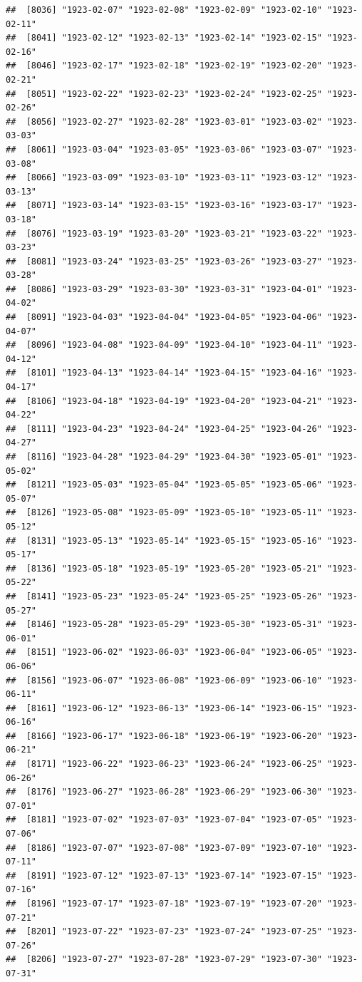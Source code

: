\documentclass{article}\usepackage[]{graphicx}\usepackage[]{color}
\makeatletter
\newenvironment{kframe}{%
 \def\at@end@of@kframe{}%
 \ifinner\ifhmode%
  \def\at@end@of@kframe{\end{minipage}}%
  \begin{minipage}{\columnwidth}%
 \fi\fi%
 \def\FrameCommand##1{\hskip\@totalleftmargin \hskip-\fboxsep
 \colorbox{shadecolor}{##1}\hskip-\fboxsep
     \hskip-\linewidth \hskip-\@totalleftmargin \hskip\columnwidth}%
 \MakeFramed {\advance\hsize-\width
   \@totalleftmargin\z@ \linewidth\hsize
   \@setminipage}}%
 {\par\unskip\endMakeFramed%
 \at@end@of@kframe}
\newenvironment{knitrout}{}{} %
\makeatother
\begin{document}
\begin{description}
\begin{knitrout}
\begin{kframe}
\begin{verbatim}
##  [8036] "1923-02-07" "1923-02-08" "1923-02-09" "1923-02-10" "1923-02-11"
##  [8041] "1923-02-12" "1923-02-13" "1923-02-14" "1923-02-15" "1923-02-16"
##  [8046] "1923-02-17" "1923-02-18" "1923-02-19" "1923-02-20" "1923-02-21"
##  [8051] "1923-02-22" "1923-02-23" "1923-02-24" "1923-02-25" "1923-02-26"
##  [8056] "1923-02-27" "1923-02-28" "1923-03-01" "1923-03-02" "1923-03-03"
##  [8061] "1923-03-04" "1923-03-05" "1923-03-06" "1923-03-07" "1923-03-08"
##  [8066] "1923-03-09" "1923-03-10" "1923-03-11" "1923-03-12" "1923-03-13"
##  [8071] "1923-03-14" "1923-03-15" "1923-03-16" "1923-03-17" "1923-03-18"
##  [8076] "1923-03-19" "1923-03-20" "1923-03-21" "1923-03-22" "1923-03-23"
##  [8081] "1923-03-24" "1923-03-25" "1923-03-26" "1923-03-27" "1923-03-28"
##  [8086] "1923-03-29" "1923-03-30" "1923-03-31" "1923-04-01" "1923-04-02"
##  [8091] "1923-04-03" "1923-04-04" "1923-04-05" "1923-04-06" "1923-04-07"
##  [8096] "1923-04-08" "1923-04-09" "1923-04-10" "1923-04-11" "1923-04-12"
##  [8101] "1923-04-13" "1923-04-14" "1923-04-15" "1923-04-16" "1923-04-17"
##  [8106] "1923-04-18" "1923-04-19" "1923-04-20" "1923-04-21" "1923-04-22"
##  [8111] "1923-04-23" "1923-04-24" "1923-04-25" "1923-04-26" "1923-04-27"
##  [8116] "1923-04-28" "1923-04-29" "1923-04-30" "1923-05-01" "1923-05-02"
##  [8121] "1923-05-03" "1923-05-04" "1923-05-05" "1923-05-06" "1923-05-07"
##  [8126] "1923-05-08" "1923-05-09" "1923-05-10" "1923-05-11" "1923-05-12"
##  [8131] "1923-05-13" "1923-05-14" "1923-05-15" "1923-05-16" "1923-05-17"
##  [8136] "1923-05-18" "1923-05-19" "1923-05-20" "1923-05-21" "1923-05-22"
##  [8141] "1923-05-23" "1923-05-24" "1923-05-25" "1923-05-26" "1923-05-27"
##  [8146] "1923-05-28" "1923-05-29" "1923-05-30" "1923-05-31" "1923-06-01"
##  [8151] "1923-06-02" "1923-06-03" "1923-06-04" "1923-06-05" "1923-06-06"
##  [8156] "1923-06-07" "1923-06-08" "1923-06-09" "1923-06-10" "1923-06-11"
##  [8161] "1923-06-12" "1923-06-13" "1923-06-14" "1923-06-15" "1923-06-16"
##  [8166] "1923-06-17" "1923-06-18" "1923-06-19" "1923-06-20" "1923-06-21"
##  [8171] "1923-06-22" "1923-06-23" "1923-06-24" "1923-06-25" "1923-06-26"
##  [8176] "1923-06-27" "1923-06-28" "1923-06-29" "1923-06-30" "1923-07-01"
##  [8181] "1923-07-02" "1923-07-03" "1923-07-04" "1923-07-05" "1923-07-06"
##  [8186] "1923-07-07" "1923-07-08" "1923-07-09" "1923-07-10" "1923-07-11"
##  [8191] "1923-07-12" "1923-07-13" "1923-07-14" "1923-07-15" "1923-07-16"
##  [8196] "1923-07-17" "1923-07-18" "1923-07-19" "1923-07-20" "1923-07-21"
##  [8201] "1923-07-22" "1923-07-23" "1923-07-24" "1923-07-25" "1923-07-26"
##  [8206] "1923-07-27" "1923-07-28" "1923-07-29" "1923-07-30" "1923-07-31"

\end{verbatim}
\end{kframe}
\end{knitrout}
\end{description}
\end{document}
